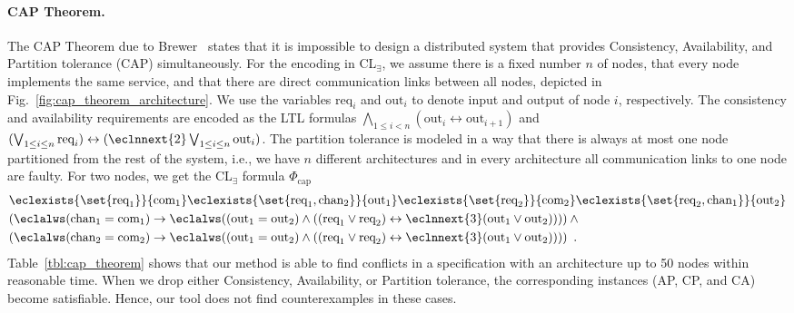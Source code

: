 \documentclass{LMCS}
\theoremstyle{plain}\newtheorem{theorem}[thm]{Theorem}
\theoremstyle{plain}\newtheorem{lemma}[thm]{Lemma}
\theoremstyle{plain}\newtheorem{proposition}[thm]{Proposition}
\theoremstyle{plain}\newtheorem{corollary}[thm]{Corollary}
\theoremstyle{definition}\newtheorem{definition}{Definition}[section]
\begin{document}
\paragraph{\bf CAP Theorem.}
\noindent
The CAP Theorem due to Brewer~\cite{DBLP:conf/podc/Brewer00} states that it is impossible to design a distributed system that provides Consistency, Availability, and Partition tolerance (CAP) simultaneously.
For the encoding in CL$_\exists$, we assume there is a fixed number $n$ of nodes, that every node implements the same service, and that there are direct communication links between all nodes, depicted in Fig.~\ref{fig:cap_theorem_architecture}.
We use the variables $\text{req}_i$ and $\text{out}_i$ to denote input and output of node $i$, respectively.
The consistency and availability requirements are encoded as the LTL formulas $\bigwedge_{1 \leq i < n} (\text{out}_i \leftrightarrow \text{out}_{i+1})$ and $(\bigvee_{1 \leq i \leq n} \text{req}_i) \leftrightarrow (\eclnnext{2} \bigvee_{1 \leq i \leq n} \text{out}_i)$.
The partition tolerance is modeled in a way that there is always at most one node partitioned from the rest of the system, i.e., we have $n$ different architectures and in every architecture all communication links to one node are faulty.
For two nodes, we get the CL$_\exists$ formula $\Phi_\text{cap}$
\begin{align} \label{eq:cap_theorem}
  &\eclexists{\set{\text{req}_1}}{\text{com}_1} \eclexists{\set{\text{req}_1, \text{chan}_2}}{\text{out}_1} \eclexists{\set{\text{req}_2}}{\text{com}_2} \eclexists{\set{\text{req}_2, \text{chan}_1}}{\text{out}_2} \nonumber\\
  & ( \eclalws ( \text{chan}_1 = \text{com}_1 ) \rightarrow \eclalws ( (\text{out}_1 = \text{out}_2) \land ( (\text{req}_1 \lor \text{req}_2) \leftrightarrow \eclnnext{3} (\text{out}_1 \lor \text{out}_2) ) ) ) \land {} \nonumber\\
  & ( \eclalws ( \text{chan}_2 = \text{com}_2 ) \rightarrow \eclalws ( (\text{out}_1 = \text{out}_2) \land ( (\text{req}_1 \lor \text{req}_2) \leftrightarrow \eclnnext{3}(\text{out}_1 \lor \text{out}_2) ) ) ) \enspace .
\end{align}\noindent Table~\ref{tbl:cap_theorem} shows that our method is able to find conflicts in a specification with an architecture up to 50 nodes within reasonable time.
When we drop either Consistency, Availability, or Partition tolerance, the corresponding instances (AP, CP, and CA) become satisfiable.
Hence, our tool does not find counterexamples in these cases.
\end{document}
